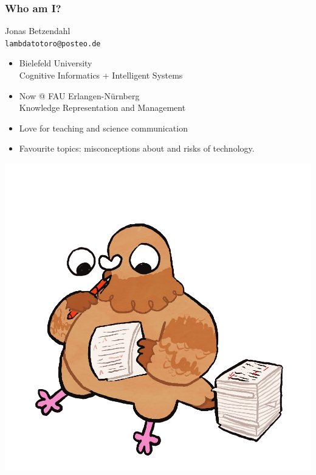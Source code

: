 \documentclass[aspectratio=169,dvipsnames]{beamer}
\begin{document}
\begin{frame}
\frametitle{Who am I?}
\begin{minipage}{0.6\textwidth}
\Large Jonas Betzendahl\normalsize\\
\texttt{lambdatotoro@posteo.de}
\bigskip

\begin{itemize}
\item Bielefeld University\\Cognitive Informatics + Intelligent Systems
\item Now @ FAU Erlangen-Nürnberg\\Knowledge Representation and Management
\item Love for teaching and science communication
\item Favourite topics: misconceptions about and risks of technology.
\end{itemize}

\end{minipage}%
\begin{minipage}{0.4\textwidth}
\begin{center}
\includegraphics[scale=0.15,keepaspectratio]{images/pigeon_jonas}
\end{center}
\end{minipage}
\end{frame}
\end{document}
